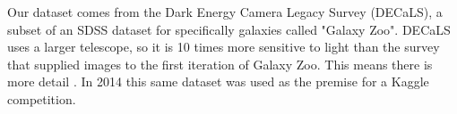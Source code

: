 Our dataset comes from the Dark Energy Camera Legacy Survey (DECaLS), a subset of an SDSS dataset for specifically galaxies called "Galaxy Zoo". DECaLS uses a larger telescope, so it is 10 times more sensitive to light than the survey that supplied images to the first iteration of Galaxy Zoo. This means there is more detail \cite{zooniverse}. In 2014 this same dataset was used as the premise for a Kaggle competition.

